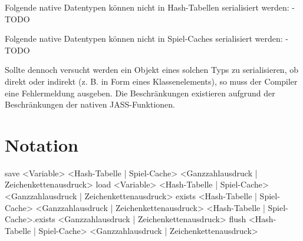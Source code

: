 Folgende native Datentypen können nicht in Hash-Tabellen serialisiert werden:
-
TODO

Folgende native Datentypen können nicht in Spiel-Caches serialisiert werden:
-
TODO

Sollte dennoch versucht werden ein Objekt eines solchen Typs zu serialisieren, ob direkt oder indirekt (z. B. in Form eines Klassenelements), so muss der Compiler eine Fehlermeldung ausgeben.
Die Beschränkungen existieren aufgrund der Beschränkungen der nativen JASS-Funktionen.

\section{Notation}
save <Variable> <Hash-Tabelle | Spiel-Cache> <Ganzzahlausdruck | Zeichenkettenausdruck>
load <Variable> <Hash-Tabelle | Spiel-Cache> <Ganzzahlausdruck | Zeichenkettenausdruck>
exists <Hash-Tabelle | Spiel-Cache> <Ganzzahlausdruck | Zeichenkettenausdruck>
<Hash-Tabelle | Spiel-Cache>.exists <Ganzzahlausdruck | Zeichenkettenausdruck>
flush <Hash-Tabelle | Spiel-Cache> <Ganzzahlausdruck | Zeichenkettenausdruck> 
